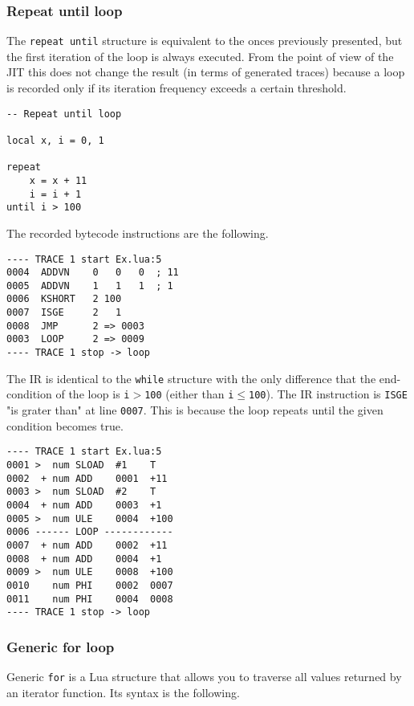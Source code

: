 \subsubsection{Repeat until loop}
The \texttt{repeat until} structure is equivalent to the onces previously presented, but the first iteration of the loop is always executed. From the point of view of the JIT this does not change the result (in terms of generated traces) because a loop is recorded only if its iteration frequency exceeds a certain threshold.
\begin{mdframed}[style=LuaStyleFrame]
\begin{lstlisting}[style=LuaStyle]
-- Repeat until loop

local x, i = 0, 1

repeat
	x = x + 11
	i = i + 1
until i > 100
\end{lstlisting}
\end{mdframed}
\noindent The recorded bytecode instructions are the following.
\begin{multicols}{2}
\begin{lstlisting}[style=DumpStyle]
---- TRACE 1 start Ex.lua:5
0004  ADDVN    0   0   0  ; 11
0005  ADDVN    1   1   1  ; 1
0006  KSHORT   2 100
0007  ISGE     2   1
0008  JMP      2 => 0003
0003  LOOP     2 => 0009
---- TRACE 1 stop -> loop
\end{lstlisting}
\end{multicols}
\noindent The IR is identical to the \texttt{while} structure with the only difference that the end-condition of the loop is \texttt{i$>$100} (either than \texttt{i$\le$100}). The IR instruction is \texttt{ISGE} "is grater than" at line \texttt{0007}. This is because the loop repeats until the given condition becomes true.
\begin{multicols}{2}
\begin{lstlisting}[style=DumpStyle]
---- TRACE 1 start Ex.lua:5
0001 >  num SLOAD  #1    T
0002  + num ADD    0001  +11 
0003 >  num SLOAD  #2    T
0004  + num ADD    0003  +1  
0005 >  num ULE    0004  +100
0006 ------ LOOP ------------
0007  + num ADD    0002  +11 
0008  + num ADD    0004  +1  
0009 >  num ULE    0008  +100
0010    num PHI    0002  0007
0011    num PHI    0004  0008
---- TRACE 1 stop -> loop

\end{lstlisting}
\end{multicols}

\subsubsection{Generic for loop}
Generic \texttt{for} is a Lua structure that allows you to traverse all values returned by an iterator function. Its syntax is the following.

